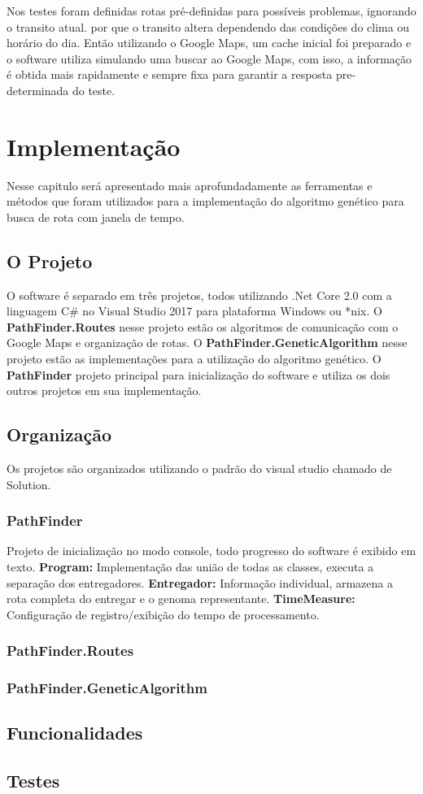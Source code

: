 Nos testes foram definidas rotas pré-definidas para possíveis problemas, ignorando o transito atual. por que o transito altera dependendo das condições do clima ou horário do dia. Então utilizando o Google Maps, um cache inicial foi preparado e o software utiliza simulando uma buscar ao Google Maps, com isso, a informação é obtida mais rapidamente e sempre fixa para garantir a resposta pre-determinada do teste.

\chapter{Implementação}
 
Nesse capitulo será apresentado mais aprofundadamente as ferramentas e métodos que foram utilizados para a implementação do algoritmo genético para busca de rota com janela de tempo.
 
\section{O Projeto}
O software é separado em três projetos, todos utilizando .Net Core 2.0 com a linguagem C\# no Visual Studio 2017 para plataforma Windows ou \**nix.
O \textbf{PathFinder.Routes} nesse projeto estão os algoritmos de comunicação com o Google Maps e organização de rotas. 
O \textbf{PathFinder.GeneticAlgorithm} nesse projeto estão as implementações para a utilização do algoritmo genético.
O \textbf{PathFinder} projeto principal para inicialização do software e utiliza os dois outros projetos em sua implementação.

\section{Organização}
Os projetos são organizados utilizando o padrão do visual studio chamado de Solution.

\subsection{PathFinder}
Projeto de inicialização no modo console, todo progresso do software é exibido em texto.
\textbf{Program:} Implementação das união de todas as classes, executa a separação dos entregadores.
\textbf{Entregador:} Informação individual, armazena a rota completa do entregar e o genoma representante.
\textbf{TimeMeasure:} Configuração de registro/exibição do tempo de processamento.
\subsection{PathFinder.Routes}

\subsection{PathFinder.GeneticAlgorithm}


\section{Funcionalidades}

\section{Testes}